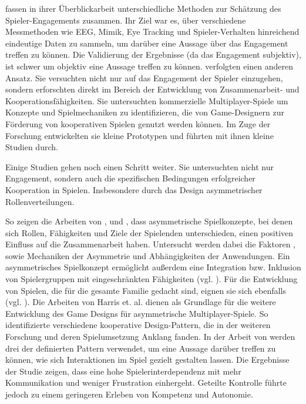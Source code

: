 \cite{rashed_review_2025} fassen in ihrer Überblickarbeit unterschiedliche Methoden zur Schätzung des Spieler-Engagements zusammen. Ihr Ziel war es, über verschiedene Messmethoden wie EEG, Mimik, Eye Tracking und Spieler-Verhalten hinreichend eindeutige Daten zu sammeln, um darüber eine Aussage über das Engagement treffen zu können. Die Validierung der Ergebnisse (da das Engagement subjektiv), ist schwer um objektiv eine  Aussage treffen zu können. \cite{yu_video_2023} verfolgten einen anderen Ansatz. Sie versuchten nicht nur auf das Engagement der Spieler einzugehen, sondern erforschten direkt im Bereich der Entwicklung von Zusammenarbeit- und Kooperationsfähigkeiten. Sie untersuchten kommerzielle Multiplayer-Spiele um Konzepte und Spielmechaniken zu identifizieren, die von Game-Designern zur Förderung von kooperativen Spielen genutzt werden können. Im Zuge der Forschung entwickelten sie kleine Prototypen und führten mit ihnen kleine Studien durch. 

Einige Studien gehen noch einen Schritt weiter. Sie untersuchten nicht nur Engagement, sondern auch die spezifischen Bedingungen erfolgreicher Kooperation in Spielen. Insbesondere durch das Design asymmetrischer Rollenverteilungen.

So zeigen die Arbeiten von \cite{harris_beam_2014}, \cite{harris_leveraging_2016} und \cite{harris_asymmetry_2019}, dass asymmetrische Spielkonzepte, bei denen sich Rollen, Fähigkeiten und Ziele der Spielenden unterschieden, einen positiven Einfluss auf die Zusammenarbeit haben. Untersucht werden dabei die Faktoren ,  sowie Mechaniken der Asymmetrie und Abhängigkeiten der Anwendungen. Ein asymmetrisches Spielkonzept ermöglicht außerdem eine Integration bzw. Inklusion von Spielergruppen mit eingeschränkten Fähigkeiten (vgl. \citealp{goncalves_exploring_2021}). Für die Entwicklung von Spielen, die für die gesamte Familie gedacht sind, eignen sie sich ebenfalls (vgl. \citealp{pais_promoting_2024}).
Die Arbeiten von Harris et. al. dienen als Grundlage für die weitere Entwicklung des Game Designs für asymmetrische Multiplayer-Spiele. So identifizierte \cite{rocha_game_2008} verschiedene kooperative Design-Pattern, die in der weiteren Forschung und deren Spielumsetzung Anklang fanden. In der Arbeit von \cite{emmerich_impact_2017} werden drei der definierten Pattern verwendet, um eine Aussage darüber treffen zu können, wie sich Interaktionen im Spiel gezielt gestalten lassen. Die Ergebnisse der Studie zeigen, dass eine hohe Spielerinterdependenz mit mehr Kommunikation und weniger Frustration einhergeht. Geteilte Kontrolle führte jedoch zu einem geringeren Erleben von Kompetenz und Autonomie.

